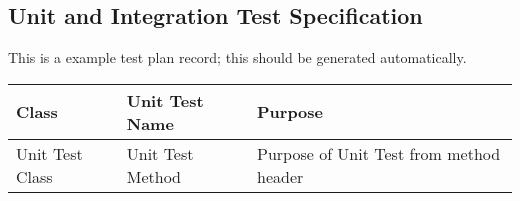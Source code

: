\subsection{Unit and Integration Test Specification}

This is a example test plan record; this should be generated automatically.

\begin{longtable} {|p{}|p{}|p{}|}\hline
{\bf Class} & {\bf Unit Test Name} & {\bf Purpose}  \\\hline
Unit Test Class & 
Unit Test Method & 
Purpose of Unit Test from method header \\\hline
\end{longtable}





